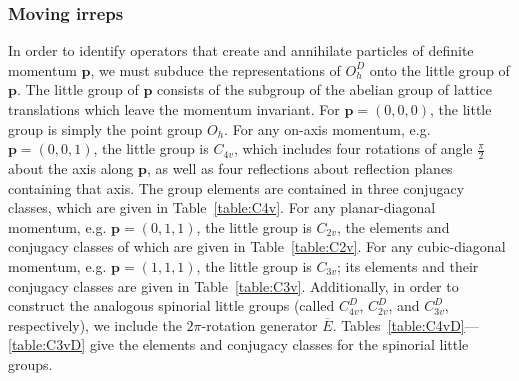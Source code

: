     \subsubsection{Moving irreps}
    In order to identify operators that create and annihilate particles of definite momentum $\boldsymbol p$, we must subduce the representations of $O_h^D$ onto the little group of $\boldsymbol p$. The little group of $\boldsymbol p$ consists of the subgroup of the abelian group of lattice translations which leave the momentum invariant. For $\boldsymbol p = (0, 0, 0)$, the little group is simply the point group $O_h$. For any on-axis momentum, e.g. $\boldsymbol p = (0, 0, 1)$, the little group is $C_{4v}$, which includes four rotations of angle $\frac{\pi}{2}$ about the axis along $\boldsymbol p$, as well as four reflections about reflection planes containing that axis. The group elements are contained in three conjugacy classes, which are given in Table~\ref{table:C4v}.  For any planar-diagonal momentum, e.g. $\boldsymbol p = (0, 1, 1)$, the little group is $C_{2v}$, the elements and conjugacy classes of which are given in Table~\ref{table:C2v}. For any cubic-diagonal momentum, e.g. $\boldsymbol p = (1,1,1)$, the little group is $C_{3v}$; its elements and their conjugacy classes are given in Table~\ref{table:C3v}. Additionally, in order to construct the analogous spinorial little groups (called $C_{4v}^D$, $C_{2v}^D$, and $C_{3v}^D$, respectively), we include the $2\pi$-rotation generator $\overline E$. Tables~\ref{table:C4vD}---\ref{table:C3vD} give the elements and conjugacy classes for the spinorial little groups.
    
